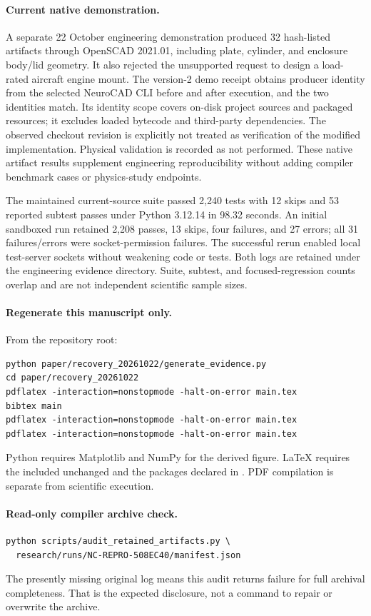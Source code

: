 \documentclass[10pt]{article}
\newcommand{\code}[1]{\texttt{\detokenize{#1}}}
\begin{document}
\paragraph{Current native demonstration.}
A separate 22 October engineering demonstration produced 32 hash-listed
artifacts through OpenSCAD 2021.01, including plate, cylinder, and enclosure
body/lid geometry. It also rejected the unsupported request to design a
load-rated aircraft engine mount. The version-2 demo receipt obtains producer
identity from the selected NeuroCAD CLI before and after execution, and the
two identities match. Its identity scope covers on-disk project sources and
packaged resources; it excludes loaded bytecode and third-party dependencies.
The observed checkout revision is explicitly not treated as verification of
the modified implementation. Physical validation is recorded as not performed.
These native artifact results supplement engineering reproducibility without
adding compiler benchmark cases or physics-study endpoints.

The maintained current-source suite passed 2,240 tests with 12 skips and
53 reported subtest passes under Python 3.12.14 in 98.32 seconds. An initial
sandboxed run retained 2,208 passes, 13 skips, four failures, and 27 errors;
all 31 failures/errors were socket-permission failures. The successful
rerun enabled local test-server sockets without weakening code or tests.
Both logs are retained under the engineering evidence directory. Suite,
subtest, and focused-regression counts overlap and are not independent
scientific sample sizes.

\paragraph{Regenerate this manuscript only.}
From the repository root:
\begin{Verbatim}[fontsize=\small]
python paper/recovery_20261022/generate_evidence.py
cd paper/recovery_20261022
pdflatex -interaction=nonstopmode -halt-on-error main.tex
bibtex main
pdflatex -interaction=nonstopmode -halt-on-error main.tex
pdflatex -interaction=nonstopmode -halt-on-error main.tex
\end{Verbatim}
Python requires Matplotlib and NumPy for the derived figure. LaTeX requires
the included unchanged \code{arxiv.sty} and the packages declared in
\code{main.tex}. PDF compilation is separate from scientific execution.

\paragraph{Read-only compiler archive check.}
\begin{Verbatim}[fontsize=\small]
python scripts/audit_retained_artifacts.py \
  research/runs/NC-REPRO-508EC40/manifest.json
\end{Verbatim}
The presently missing original log means this audit returns failure for full
archival completeness. That is the expected disclosure, not a command to
repair or overwrite the archive.
\end{document}
